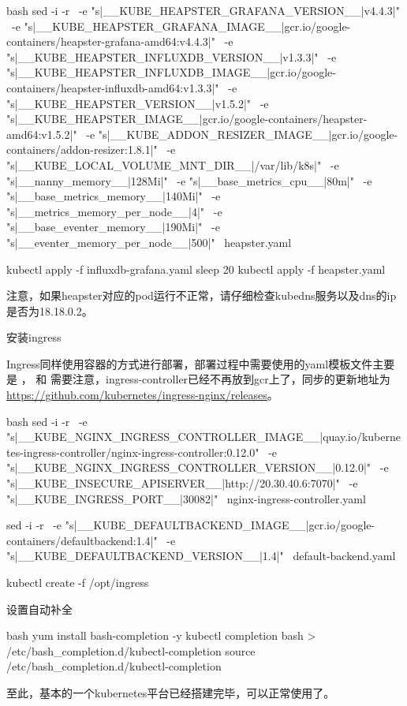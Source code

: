 \begin{outline}[enumerate]
\begin{code-block}{bash}
sed -i -r \
    -e "s|__KUBE_HEAPSTER_GRAFANA_VERSION__|v4.4.3|" \
    -e "s|__KUBE_HEAPSTER_GRAFANA_IMAGE__|gcr.io/google-containers/heapster-grafana-amd64:v4.4.3|" \
    -e "s|__KUBE_HEAPSTER_INFLUXDB_VERSION__|v1.3.3|" \
    -e "s|__KUBE_HEAPSTER_INFLUXDB_IMAGE__|gcr.io/google-containers/heapster-influxdb-amd64:v1.3.3|" \
    -e "s|__KUBE_HEAPSTER_VERSION__|v1.5.2|" \
    -e "s|__KUBE_HEAPSTER_IMAGE__|gcr.io/google-containers/heapster-amd64:v1.5.2|" \
    -e "s|__KUBE_ADDON_RESIZER_IMAGE__|gcr.io/google-containers/addon-resizer:1.8.1|" \
    -e "s|__KUBE_LOCAL_VOLUME_MNT_DIR__|/var/lib/k8s|" \
    -e "s|__nanny_memory__|128Mi|" \
    -e "s|__base_metrics_cpu__|80m|" \
    -e "s|__base_metrics_memory__|140Mi|" \
    -e "s|__metrics_memory_per_node__|4|" \
    -e "s|__base_eventer_memory__|190Mi|" \
    -e "s|__eventer_memory_per_node__|500|" \
    heapster.yaml

kubectl apply -f influxdb-grafana.yaml
sleep 20
kubectl apply -f heapster.yaml
\end{code-block}
注意，如果heapster对应的pod运行不正常，请仔细检查kubedns服务以及dns的ip是否为18.18.0.2。

\1 安装ingress

Ingress同样使用容器的方式进行部署，部署过程中需要使用的yaml模板文件主要是
，
和
需要注意，ingress-controller已经不再放到gcr上了，同步的更新地址为\url{https://github.com/kubernetes/ingress-nginx/releases}。
\begin{code-block}{bash}
sed -i -r \
    -e "s|__KUBE_NGINX_INGRESS_CONTROLLER_IMAGE__|quay.io/kubernetes-ingress-controller/nginx-ingress-controller:0.12.0" \
    -e "s|__KUBE_NGINX_INGRESS_CONTROLLER_VERSION__|0.12.0|" \
    -e "s|__KUBE_INSECURE_APISERVER__|http://20.30.40.6:7070|" \
    -e "s|__KUBE_INGRESS_PORT__|30082|" \
    nginx-ingress-controller.yaml

sed -i -r \
    -e "s|__KUBE_DEFAULTBACKEND_IMAGE__|gcr.io/google-containers/defaultbackend:1.4|" \
    -e "s|__KUBE_DEFAULTBACKEND_VERSION__|1.4|" \
    default-backend.yaml

kubectl create -f /opt/ingress
\end{code-block}

\1 设置自动补全
\begin{code-block}{bash}
yum install bash-completion -y
kubectl completion bash > /etc/bash_completion.d/kubectl-completion
source /etc/bash_completion.d/kubectl-completion
\end{code-block}

至此，基本的一个kubernetes平台已经搭建完毕，可以正常使用了。
\end{outline}
